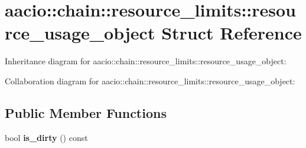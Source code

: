 \hypertarget{structaacio_1_1chain_1_1resource__limits_1_1resource__usage__object}{}\section{aacio\+:\+:chain\+:\+:resource\+\_\+limits\+:\+:resource\+\_\+usage\+\_\+object Struct Reference}
\label{structaacio_1_1chain_1_1resource__limits_1_1resource__usage__object}


Inheritance diagram for aacio\+:\+:chain\+:\+:resource\+\_\+limits\+:\+:resource\+\_\+usage\+\_\+object\+:


Collaboration diagram for aacio\+:\+:chain\+:\+:resource\+\_\+limits\+:\+:resource\+\_\+usage\+\_\+object\+:
\subsection*{Public Member Functions}
\begin{DoxyCompactItemize}
\item 
\mbox{\label{structaacio_1_1chain_1_1resource__limits_1_1resource__usage__object_a176a8659870b76899cb0ba00d34fef42}} 
bool {\bfseries is\+\_\+dirty} () const
\end{DoxyCompactItemize}
